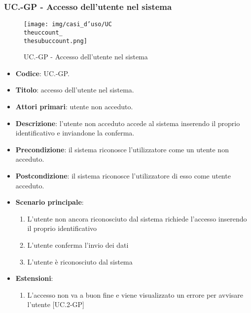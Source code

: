 	\subsubsection{UC\theuccount.\thesubuccount-GP - Accesso dell'utente nel sistema}
		\begin{figure}[H]
			\centering
				\texttt{[image: img/casi\_d'uso/UC\\theuccount\_\\thesubuccount.png]}\\
			\caption{UC\theuccount.\thesubuccount-GP - Accesso dell'utente nel sistema}
		\end{figure}
		\begin{itemize}
			\item \textbf{Codice}: UC\theuccount.\thesubuccount-GP.
			\item \textbf{Titolo}: accesso dell'utente nel sistema.
			\item \textbf{Attori primari}: utente non acceduto.
			\item \textbf{Descrizione}: l'utente non acceduto accede al sistema inserendo il proprio identificativo e inviandone la conferma.
			\item \textbf{Precondizione}: il sistema riconosce l'utilizzatore come un utente non acceduto.
			\item \textbf{Postcondizione}: il sistema riconosce l'utilizzatore di esso come utente acceduto.
			\item \textbf{Scenario principale}:
			\begin{enumerate}
				\item L’utente non ancora riconosciuto dal sistema richiede l'accesso inserendo il proprio identificativo
				\item L'utente conferma l'invio dei dati
				\item L'utente è riconosciuto dal sistema
			\end{enumerate}
			\item \textbf{Estensioni}:
			\begin{enumerate}
				\item L'accesso non va a buon fine e viene visualizzato un errore per avvisare l'utente [UC\theuccount.2-GP]
			\end{enumerate}
		\end{itemize}

		\newpage

